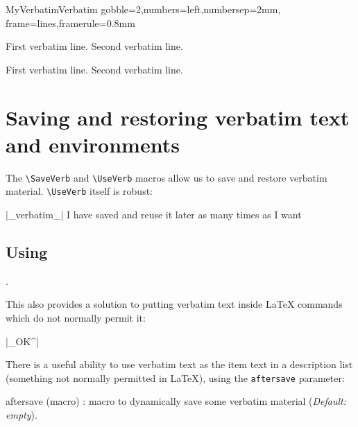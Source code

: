 \documentclass[twoside]{article}
\newcommand\cs[1]{\texttt{\textbackslash#1}}
\providecommand\optname[1]{\textsf{#1}}
\newenvironment{optlist}{\begin{description}%
  \renewcommand\makelabel[1]{%
    \descriptionlabel{\mdseries\optname{##1}}}%
  \itemsep0.25\itemsep}%
 {\end{description}}
\begin{document}
\begin{SideBySideExample}
  \DefineVerbatimEnvironment%
    {MyVerbatim}{Verbatim}
    {gobble=2,numbers=left,numbersep=2mm,
     frame=lines,framerule=0.8mm}
  \begin{MyVerbatim}
    First verbatim line.
    Second verbatim line.
  \end{MyVerbatim}

  \begin{MyVerbatim}[numbers=none,
                     framerule=1pt]
    First verbatim line.
    Second verbatim line.
  \end{MyVerbatim}
\end{SideBySideExample}

\section{Saving and restoring verbatim text and environments}

  The \cs{SaveVerb} and \cs{UseVerb} macros allow us to save and restore
verbatim material. \cs{UseVerb} itself is robust:

\begin{SideBySideExample}
  \DefineShortVerb{\|}
  |_verbatim_|
  I have saved  and reuse 
  it later as many times as I want
  \subsection*{Using }
  .
\end{SideBySideExample}

  This also provides a solution to putting verbatim text inside \LaTeX{}
commands which do not normally permit it: %

{
\begin{Example}
  \DefineShortVerb{\|}|_OK^| 
\end{Example}
}

  There is a useful ability to use verbatim text as the item text in a
description list (something not normally permitted in \LaTeX), using the
\texttt{aftersave} parameter:

\begin{optlist}
  \item[aftersave (macro)]: macro to dynamically save some verbatim material
  (\emph{Default: empty}).
\end{optlist}
\end{document}
